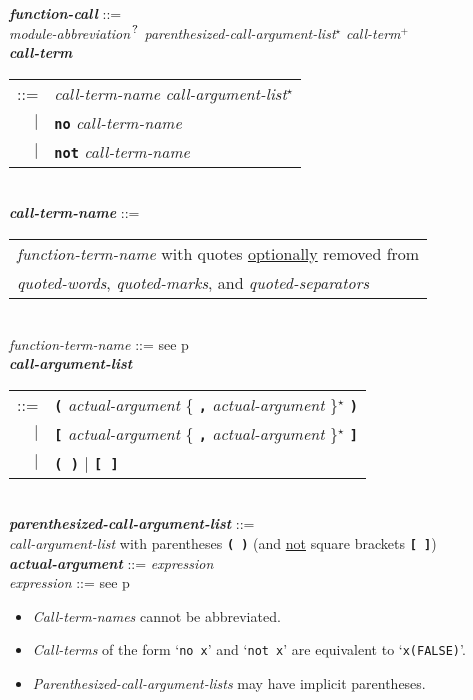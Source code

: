 \documentclass[12pt]{article}
\newcommand{\TT}[1]{{\tt \bfseries #1}}
\newcommand{\STAR}{{\Large $^\star$}}
\newcommand{\PLUS}[1][]{{$^{+#1}$}}
\newcommand{\QMARK}{{$^{\,\mbox{\footnotesize ?}}$}}
\newcommand{\ttkey}[1]{{\tt \bfseries #1}}
\newcommand{\emkey}[1]{{\em \bfseries #1}}
\newcommand{\pagref}[1]{p\pageref{#1}}
\newenvironment{indpar}[1][0.3in]%
	{\begin{list}{}%
		     {\setlength{\itemsep}{0in}%
		      \setlength{\topsep}{0in}%
		      \setlength{\parsep}{1ex}%
		      \setlength{\labelwidth}{#1}%
		      \setlength{\leftmargin}{#1}%
		      \addtolength{\leftmargin}{\labelsep}}%
	 \item}%
	{\end{list}}
\begin{document}
\begin{indpar}
\emkey{function-call}\label{FUNCTION-CALL} ::= \\
\hspace*{0.5in}
        {\em module-abbreviation}\QMARK{}
        {\em parenthesized-call-argument-list}\STAR{}
        {\em call-term}\PLUS{}
\\[0.5ex]
\emkey{call-term}\label{CALL-TERM}
    \begin{tabular}[t]{rl}
    ::= & {\em call-term-name} {\em call-argument-list}\STAR{} \\
    $|$ & \ttkey{no} {\em call-term-name} \\
    $|$ & \ttkey{not} {\em call-term-name} \\
    \end{tabular}
\\[0.5ex]
\emkey{call-term-name}\label{CALL-TERM-NAME} ::=
    \begin{tabular}[t]{@{}l}
    {\em function-term-name} with quotes \underline{optionally} removed from \\
    {\em quoted-words}, {\em quoted-marks}, and {\em quoted-separators}
    \end{tabular}
\\[0.5ex]
{\em function-term-name} ::= see \pagref{FUNCTION-TERM-NAME}
\\[0.5ex]
\emkey{call-argument-list}\label{CALL-ARGUMENT-LIST}
    \begin{tabular}[t]{rl}
    ::= & \TT{(} {\em actual-argument}
          \{ \TT{,} {\em actual-argument} \}\STAR{} \TT{)} \\
    $|$ & \TT{[} {\em actual-argument}
          \{ \TT{,} {\em actual-argument} \}\STAR{} \TT{]} \\
    $|$ & \TT{(~)} $|$ \TT{[~]} \\
    \end{tabular}
\\[0.5ex]
\emkey{parenthesized-call-argument-list}%
    \label{PARENTHESIZED-CALL-ARGUMENT-LIST} ::= \\
\hspace*{0.5in}
    {\em call-argument-list} with parentheses \TT{(~)}
    (and \underline{not} square brackets \TT{[~]})
\\[0.5ex]
\emkey{actual-argument} ::= {\em expression}
\\[0.5ex]
{\em expression} ::= see \pagref{EXPRESSION}
\begin{itemize}
\item {\em Call-term-names} cannot be abbreviated.
\item {\em Call-terms} of the form `{\tt no x}' and `{\tt not x}' are
equivalent to `{\tt x(FALSE)}'.
\item {\em Parenthesized-call-argument-lists} may have implicit
parentheses.
\end{itemize}
\end{indpar}
\end{document}
